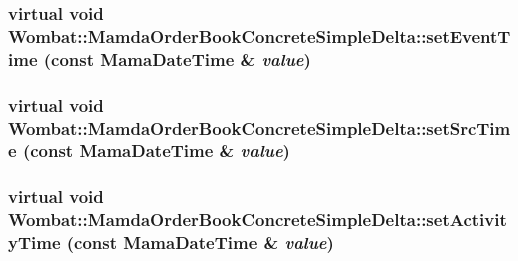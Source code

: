 \hypertarget{classWombat_1_1MamdaOrderBookConcreteSimpleDelta_6af5d520068024006162aabe75a0ec2c}{
\subsubsection[setEventTime]{\setlength{\rightskip}{0pt plus 5cm}virtual void Wombat::Mamda\-Order\-Book\-Concrete\-Simple\-Delta::set\-Event\-Time (const Mama\-Date\-Time \& {\em value})}}
\label{classWombat_1_1MamdaOrderBookConcreteSimpleDelta_6af5d520068024006162aabe75a0ec2c}


\hypertarget{classWombat_1_1MamdaOrderBookConcreteSimpleDelta_09b2909a0d47be2ed781b9b00a218c40}{
\subsubsection[setSrcTime]{\setlength{\rightskip}{0pt plus 5cm}virtual void Wombat::Mamda\-Order\-Book\-Concrete\-Simple\-Delta::set\-Src\-Time (const Mama\-Date\-Time \& {\em value})}}
\label{classWombat_1_1MamdaOrderBookConcreteSimpleDelta_09b2909a0d47be2ed781b9b00a218c40}


\hypertarget{classWombat_1_1MamdaOrderBookConcreteSimpleDelta_3677af2d28a499cf6c078de7f75539a3}{
\subsubsection[setActivityTime]{\setlength{\rightskip}{0pt plus 5cm}virtual void Wombat::Mamda\-Order\-Book\-Concrete\-Simple\-Delta::set\-Activity\-Time (const Mama\-Date\-Time \& {\em value})}}
\label{classWombat_1_1MamdaOrderBookConcreteSimpleDelta_3677af2d28a499cf6c078de7f75539a3}


